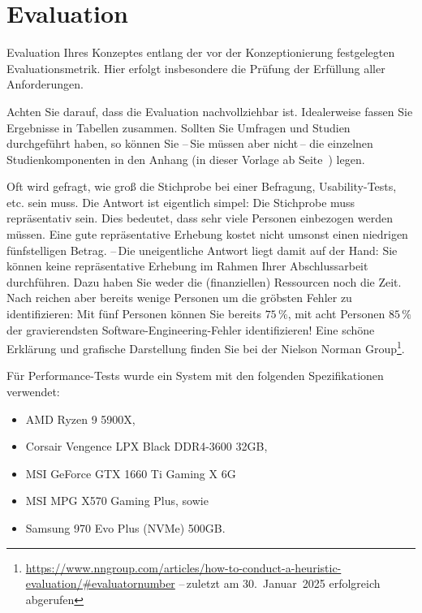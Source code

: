 \chapter{Evaluation}\label{chap:Evaluation}
Evaluation Ihres Konzeptes entlang der vor der Konzeptionierung festgelegten Evaluationsmetrik. Hier erfolgt insbesondere die Prüfung der Erfüllung aller Anforderungen.

Achten Sie darauf, dass die Evaluation nachvollziehbar ist. Idealerweise fassen Sie Ergebnisse in Tabellen zusammen. Sollten Sie Umfragen und Studien durchgeführt haben, so können Sie --\,Sie müssen aber nicht\,-- die einzelnen Studienkomponenten in den Anhang (in dieser Vorlage ab Seite~\pageref{apdx:A}) legen.

Oft wird gefragt, wie groß die Stichprobe bei einer Befragung, Usability-Tests, etc. sein muss. Die Antwort ist eigentlich simpel: Die Stichprobe muss repräsentativ sein. Dies bedeutet, dass sehr viele Personen einbezogen werden müssen. Eine gute repräsentative Erhebung kostet nicht umsonst einen niedrigen fünfstelligen Betrag. --\,Die uneigentliche Antwort liegt damit auf der Hand: Sie können keine repräsentative Erhebung im Rahmen Ihrer Abschlussarbeit durchführen. Dazu haben Sie weder die (finanziellen) Ressourcen noch die Zeit. Nach \cite{nielsen1990,nielsen1994} reichen aber bereits wenige Personen um die gröbsten Fehler zu identifizieren: Mit fünf Personen können Sie bereits $75\,\%$, mit acht Personen $85\,\%$\, der gravierendsten Software-Engineering-Fehler identifizieren! Eine schöne Erklärung und grafische Darstellung finden Sie bei der Nielson Norman Group\footnote{\url{https://www.nngroup.com/articles/how-to-conduct-a-heuristic-evaluation/\#evaluatornumber} --\,zuletzt am 30.~Januar~2025 erfolgreich abgerufen}.


\noindent Für Performance-Tests wurde ein System mit den folgenden Spezifikationen verwendet:
\begin{itemize}
    \item AMD Ryzen 9 5900X,
    \item Corsair Vengence LPX Black DDR4-3600 32GB,
    \item MSI GeForce GTX 1660 Ti Gaming X 6G
    \item MSI MPG X570 Gaming Plus, sowie
    \item Samsung 970 Evo Plus (NVMe) 500GB.
\end{itemize}